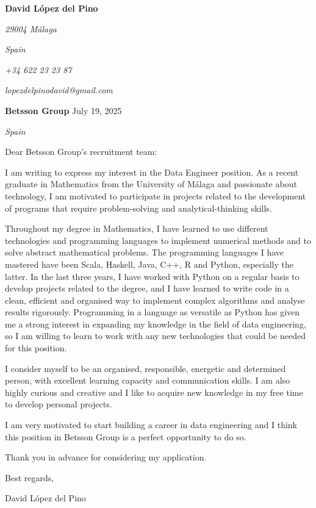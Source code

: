 \documentclass[11pt, letterpaper]{article}
\begin{document}
\begin{flushright}
    \color{gray}
    \textbf{David López del Pino}

    \vspace{-\baselineskip}
    \textsl{29004 Málaga}

    \vspace{-\baselineskip}
    \textsl{Spain}


    \vspace{-\baselineskip}
    \textsl{+34 622 23 23 87}

    \vspace{-\baselineskip}
    \textsl{lopezdelpinodavid@gmail.com}

\end{flushright}

\textbf{Betsson Group} \hfill July 19, 2025

\vspace{-\baselineskip}
\textsl{Spain}

Dear Betsson Group's recruitment team:

I am writing to express my interest in the Data Engineer position. As a recent graduate in Mathematics from the University of Málaga and passionate about technology, I am motivated to participate in projects related to the development of programs that require problem-solving and analytical-thinking skills. 

Throughout my degree in Mathematics, I have learned to use different technologies and programming languages to implement numerical methods and to solve abstract mathematical problems. The programming languages I have mastered have been Scala, Haskell, Java, C++, R and Python, especially the latter. In the last three years, I have worked with Python on a regular basis to develop projects related to the degree, and I have learned to write code in a clean, efficient and organised way to implement complex algorithms and analyse results rigorously. Programming in a language as versatile as Python has given me a strong interest in expanding my knowledge in the field of data engineering, so I am willing to learn to work with any new technologies that could be needed for this position.

I consider myself to be an organised, responsible, energetic and determined person, with excellent learning capacity and communication skills. I am also highly curious and creative and I like to acquire new knowledge in my free time to develop personal projects. 

I am very motivated to start building a career in data engineering and I think this position in Betsson Group is a perfect opportunity to do so.

Thank you in advance for considering my application. 

Best regards,

\vspace{-\baselineskip}
David López del Pino
\end{document}
